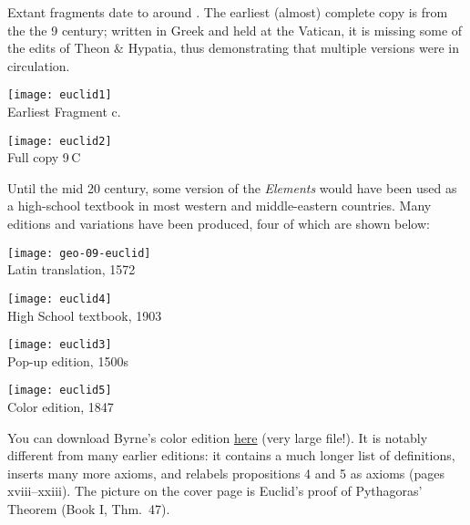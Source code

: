 Extant fragments date to around . The earliest (almost) complete copy is from the the 9\th{} century; written in Greek and held at the Vatican, it is missing some of the edits of Theon \& Hypatia, thus demonstrating that multiple versions were in circulation.

\begin{center}
\begin{minipage}[b]{0.45\linewidth}
\centering\texttt{[image: euclid1]}\\
Earliest Fragment c.\,
\end{minipage}
\begin{minipage}[b]{0.45\linewidth}
\centering\texttt{[image: euclid2]}\\
Full copy 9\th\,C
\end{minipage}
\end{center}

\goodbreak

Until the mid 20\th{} century, some version of the \emph{Elements} would have been used as a high-school textbook in most western and middle-eastern countries. Many editions and variations have been produced, four of which are shown below:
\begin{center}
\begin{minipage}[b]{0.683\linewidth}
\centering\texttt{[image: geo-09-euclid]}\\
Latin translation, 1572
\end{minipage}\begin{minipage}[b]{0.317\linewidth}
\centering\texttt{[image: euclid4]}\\
High School textbook, 1903
\end{minipage}\smallbreak
\begin{minipage}[b]{0.67\linewidth}
\centering\texttt{[image: euclid3]}\\
Pop-up edition, 1500s
\end{minipage}\begin{minipage}[b]{0.33\linewidth}
\centering\texttt{[image: euclid5]}\\
Color edition, 1847
\end{minipage}
\end{center}

You can download Byrne's color edition \href{http://math.uci.edu/~ndonalds/Elements-I-VI.pdf}{here} (very large file!). It is notably different from many earlier editions: it contains a much longer list of definitions, inserts many more axioms, and relabels propositions 4 and 5 as axioms (pages xviii--xxiii). The picture on the cover page is Euclid's proof of Pythagoras' Theorem (Book I, Thm.\ 47).
\goodbreak

